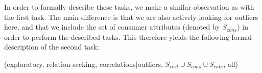 In order to formally describe these tasks, we make a similar observation as with the first task. The main difference is that we are also actively looking for outliers here, and that we include the set of consumer attributes (denoted by $S_{cons}$) in order to perform the described tasks. This therefore yields the following formal description of the second task:

(exploratory, relation-seeking, correlations$|$outliers, $S_{rest} \cup S_{cons} \cup S_{rate}$, all)

